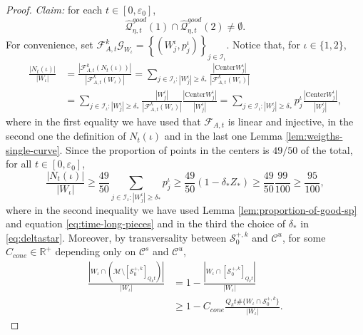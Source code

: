 \documentclass{amsart}
\numberwithin{equation}{section}
\newcommand\ve{\varepsilon}
\renewcommand{\ge}{\geqslant}
\newcommand\cF{{\mathcal F}}
\newcommand\cG{{\mathcal G}}
\newcommand\cI{{\mathcal I}}
\newcommand\cM{{\mathcal M}}
\newcommand\cQ{{\mathcal Q}}
\newcommand\cS{{\mathcal S}}
\newcommand\bR{{\mathbb R}}
\newcommand{\catt}{\cF_{A,t}}
\newcommand{\Center}{\text{Center}}
\begin{document}
\begin{proof}
\textit{Claim:} for each \(t \in [0,\ve_0]\),\\
\begin{equation}\label{eq:claim}
    \widehat\cQ_{\eta, t}^{good} (1) \cap \widehat\cQ_{\eta, t}^{good} (2) \neq \emptyset.
\end{equation}
For convenience, set \(\catt^k\cG_{W_\iota} = \left\{(W_j^\iota, p_{j}^\iota)\right\}_{j \in \cI_\iota}\). Notice that, for \(\iota \in \{ 1,2\}\),
\[
\begin{split}
  \frac{|N_t (\iota)|}{|W_\iota|} &= \frac{|\catt^k (N_{t}(\iota))|}{|\catt^k (W_{\iota})|} = \sum_{j \in \cI_\iota : |W_j^\iota| \ge \delta_{*}} \frac{|\Center W_{j}^\iota|}{|\catt^k (W_{\iota})|}  \\
&= \sum_{j \in \cI_\iota : |W_j^\iota| \ge \delta_{*}} \frac{|W_j^{\iota}|}{|\catt^k (W_{\iota})|}\frac{|\Center W_{j}^\iota|}{|W_j^{\iota}|} =  \sum_{j \in \cI_\iota : |W_j^\iota| \ge \delta_{*}}p_j^\iota \frac{\left|\Center W_{j}^\iota \right|}{|W_{j}^\iota|},
\end{split}
\]
where in the first equality we have used that \(\catt\) is linear and injective, in the second one the definition of \(N_{t}(\iota)\) and in the last one Lemma \ref{lem:weigths-single-curve}. Since the proportion of points in the centers is \(49/50\) of the total, for all \(t \in [0,\ve_0]\),
\begin{equation}\label{eq:good-prop-1}
 \frac{|N_t (\iota)|}{|W_\iota|} \ge \frac{49}{50}  \sum_{j \in \cI_\iota : |W_j^\iota| \ge \delta_{*}}p_j^\iota \ge \frac{49}{50}\left(1- \delta_{*}Z_{*}\right) \ge  \frac{49}{50} \frac{99}{100} \ge \frac {95}{100},
\end{equation}
where in the second inequality we have used Lemma \ref{lem:proportion-of-good-sp} and equation \eqref{eq:time-long-pieces} and in the third the choice of \(\delta_{*}\) in \eqref{eq:deltastar}. Moreover, by transversality between \(\cS_0^{+,k}\) and \(\mathscr C^u\), for some \(C_{cone} \in \bR^+\) depending only on \(\mathscr C^s\) and \(\mathscr C^u\),
\begin{equation}\label{eq:good-prop-2}
\begin{split}
    \frac{\left|W_\iota \cap \left( \cM \setminus  [\cS_0^{+,k} ]_{Q_k t}\right)\right|}{|W_\iota|} &=  1 -  \frac{\left|W_\iota \cap [\cS_0^{+,k} ]_{Q_k t}\right|}{|W_\iota|}\\
& \ge 1- C_{cone} \frac{ Q_k t \# \{W_\iota \cap \cS_0^{+,k}\}}{|W_\iota|}.
\end{split}
\end{equation}

\end{proof}
\end{document}
